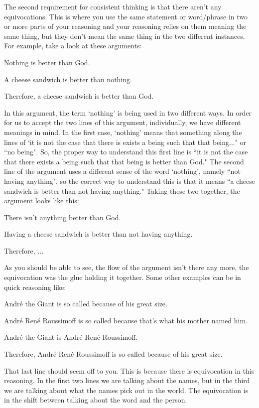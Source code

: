 The second requirement for consistent thinking is that there aren't any equivocations. This is where you use the same statement or word/phrase in two or more parts of your reasoning and your reasoning relies on them meaning the same thing, but they don't mean the same thing in the two different instances. For example, take a look at these arguments:
\begin{earg}
   \item[] Nothing is better than God.
    \item[]A cheese sandwich is better than nothing.
    \item[]Therefore, a cheese sandwich is better than God.
\end{earg}
In this argument, the term `nothing' is being used in two different ways. In order for us to accept the two lines of this argument, individually, we have different meanings in mind. In the first case, `nothing' means that something along the lines of `it is not the case that there is exists a being such that that being..." or ``no being". So, the proper way to understand this first line is ``it is not the case that there exists a being such that that being is better than God." The second line of the argument uses a different sense of the word `nothing', namely ``not having anything", so the correct way to understand this is that it means ``a cheese sandwich is better than not having anything." Taking these two together, the argument looks like this:
\begin{earg}
    \item[]There isn't anything better than God.
    \item[]Having a cheese sandwich is better than not having anything.
    \item[]Therefore, ...
\end{earg}
As you should be able to see, the flow of the argument isn't there any more, the equivocation was the glue holding it together. Some other examples can be in quick reasoning like:
\begin{earg}
    \item[]André the Giant is so called because of his great size.
    \item[]André René Roussimoff is so called because that's what his mother named him.
    \item[]André the Giant is André René Roussimoff.
    \item[]Therefore, André René Roussimoff is so called because of his great size.
\end{earg}
That last line should seem off to you. This is because there is equivocation in this reasoning. In the first two lines we are talking about the names, but in the third we are talking about what the names pick out in the world. The equivocation is in the shift between talking about the word and the person.

